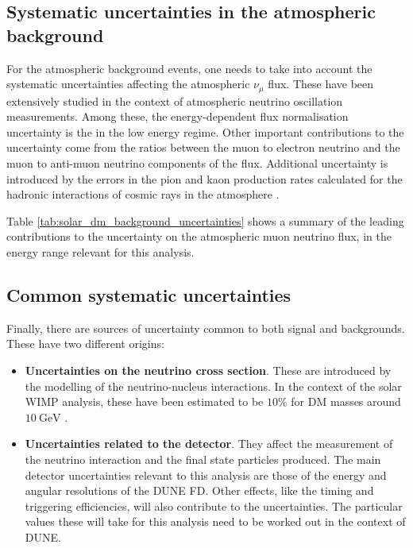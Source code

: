 \subsection{Systematic uncertainties in the atmospheric background}

For the atmospheric background events, one needs to take into account the systematic uncertainties affecting the atmospheric $\nu_{\mu}$ flux. These have been extensively studied in the context of atmospheric neutrino oscillation measurements. Among these, the energy-dependent flux normalisation uncertainty is the in the low energy regime. Other important contributions to the uncertainty come from the ratios between the muon to electron neutrino and the muon to anti-muon neutrino components of the flux. Additional uncertainty is introduced by the errors in the pion and kaon production rates calculated for the hadronic interactions of cosmic rays in the atmosphere \cite{Honda2006}.

Table \ref{tab:solar_dm_background_uncertainties} shows a summary of the leading contributions to the uncertainty on the atmospheric muon neutrino flux, in the energy range relevant for this analysis.

\subsection{Common systematic uncertainties}

Finally, there are sources of uncertainty common to both signal and backgrounds. These have two different origins:

\begin{itemize}
	\item \textbf{Uncertainties on the neutrino cross section}. These are introduced by the modelling of the neutrino-nucleus interactions. In the context of the solar WIMP analysis, these have been estimated to be $10\%$ for DM masses around $10~\mathrm{GeV}$ \cite{Boliev2013}.
	\item \textbf{Uncertainties related to the detector}. They affect the measurement of the neutrino interaction and the final state particles produced. The main detector uncertainties relevant to this analysis are those of the energy and angular resolutions of the DUNE FD. Other effects, like the timing and triggering efficiencies, will also contribute to the uncertainties. The particular values these will take for this analysis need to be worked out in the context of DUNE.
\end{itemize}